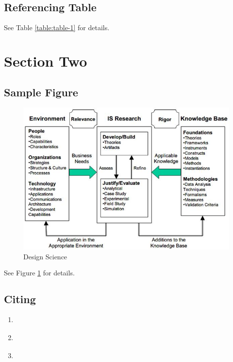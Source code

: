 \documentclass[a4paper]{article}
\begin{document}
\subsection{Referencing Table}
See Table \ref{table:table-1} for details.

\clearpage
\section{Section Two}
\subsection{Sample Figure}
\begin{figure}[htbp]
\centering
\includegraphics[width=.9\linewidth]{./figures/hevner.png}
\caption{Design Science}
\label{figure:hevner}
\end{figure}
See Figure \ref{figure:hevner} for details.
\subsection{Citing}

\begin{enumerate}
\item \parencite{hevner04_desig_scien_infor_system_resear}
\item \parencite{hevner04_desig_scien_infor_system_resear}
\item \textcite{hevner04_desig_scien_infor_system_resear}
\end{enumerate}



\clearpage
\printbibliography
\end{document}
